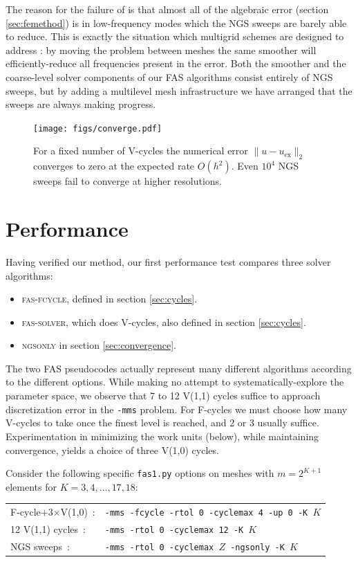 \documentclass[letterpaper,final,12pt,reqno]{amsart}
\begin{document}
The reason for the failure of  is that almost all of the algebraic error (section \ref{sec:femethod}) is in low-frequency modes which the NGS sweeps are barely able to reduce.  This is exactly the situation which multigrid schemes are designed to address \cite{BrandtLivne2011,Briggsetal2000}: by moving the problem between meshes the same smoother will efficiently-reduce all frequencies present in the error.  Both the smoother and the coarse-level solver components of our FAS algorithms consist entirely of NGS sweeps, but by adding a multilevel mesh infrastructure we have arranged that the sweeps are always making progress.

\begin{figure}
\texttt{[image: figs/converge.pdf]}
\caption{For a fixed number of V-cycles the numerical error $\|u-u_{\text{ex}}\|_2$ converges to zero at the expected rate $O(h^2)$.  Even $10^4$ NGS sweeps fail to converge at higher resolutions.}
\label{fig:converge}
\end{figure}


\section{Performance}  \label{sec:performance}

Having verified our method, our first performance test compares three solver algorithms:
\begin{itemize}
\item \textsc{fas-fcycle}, defined in section \ref{sec:cycles}.
\item \textsc{fas-solver}, which does V-cycles, also defined in section \ref{sec:cycles}.
\item \textsc{ngsonly} in section \ref{sec:convergence}.
\end{itemize}
The two FAS pseudocodes actually represent many different algorithms according to the different options.  While making no attempt to systematically-explore the parameter space, we observe that 7 to 12 V(1,1) cycles suffice to approach discretization error in the \texttt{-mms} problem.  For F-cycles we must choose how many V-cycles to take once the finest level is reached, and 2 or 3 usually suffice.  Experimentation in minimizing the work units (below), while maintaining convergence, yields a choice of three V(1,0) cycles.

Consider the following specific \texttt{fas1.py} options on meshes with $m=2^{K+1}$ elements for $K=3,4,\dots,17,18$:

\medskip
\begin{tabular}{ll}
\textsf{F-cycle$+$3$\times$V(1,0)} \,:        &\texttt{-mms -fcycle -rtol 0 -cyclemax 4 -up 0 -K }$K$ \\
\textsf{12 V(1,1) cycles} \,:  &\texttt{-mms -rtol 0 -cyclemax 12 -K }$K$ \\
\textsf{NGS sweeps} \,:      &\texttt{-mms -rtol 0 -cyclemax $Z$ -ngsonly -K }$K$
\end{tabular}
\end{document}
